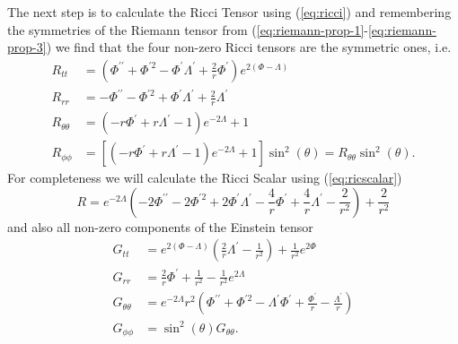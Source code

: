\documentclass[12pt]{article}
\numberwithin{equation}{section}
\numberwithin{figure}{section}
\begin{document}
The next step is to calculate the Ricci Tensor using (\ref{eq:ricci}) and remembering the symmetries of the Riemann tensor from (\ref{eq:riemann-prop-1}-\ref{eq:riemann-prop-3}) we find that the four non-zero Ricci tensors are the symmetric ones, i.e.
\begin{align}
R_{tt}&=\left(\Phi^{\prime\prime}+\Phi^{\prime2}-\Phi^\prime\Lambda^\prime+\frac{2}{r}\Phi^\prime\right)e^{2(\Phi-\Lambda)} \label{eq:riccibh1}	\\
R_{rr}&=-\Phi^{\prime\prime}-\Phi^{\prime2}+\Phi^\prime\Lambda^\prime+\frac{2}{r}\Lambda^\prime\label{eq:riccibh2}\\
R_{\theta\theta}&=(-r\Phi^\prime+r\Lambda^\prime -1)e^{-2\Lambda} +1	\label{eq:riccibh3}\\
R_{\phi\phi}&=[(-r\Phi^\prime+r\Lambda^\prime -1)e^{-2\Lambda} +1]\sin^2(\theta) = R_{\theta\theta} \sin^2(\theta).\label{eq:riccibh4}
\end{align}
For completeness we will calculate the Ricci Scalar using (\ref{eq:ricscalar})
\begin{equation}
	R=e^{-2\Lambda}\left(-2\Phi^{\prime\prime}-2\Phi^{\prime2}+2\Phi^\prime\Lambda^\prime- \frac{4}{r}\Phi^\prime +\frac{4}{r}\Lambda^\prime -\frac{2}{r^2}\right) +\frac{2}{r^2}
\end{equation}
and also all non-zero components of the Einstein tensor
\begin{align}
G_{tt} &= e^{2(\Phi-\Lambda)}\left(\frac{2}{r}\Lambda^\prime - \frac{1}{r^2}\right) +\frac{1}{r^2}e^{2\Phi}	\\
G_{rr} &= \frac{2}{r}\Phi^\prime + \frac{1}{r^2} - \frac{1}{r^2}e^{2\Lambda}	\\
G_{\theta\theta} &= e^{-2\Lambda}r^2\left(\Phi^{\prime\prime}+\Phi^{\prime2}-\Lambda^\prime\Phi^\prime +\frac{\Phi^\prime}{r}- \frac{\Lambda^\prime}{r}\right)\\
G_{\phi\phi} &= \sin^2(\theta)G_{\theta\theta}.
\end{align}
\end{document}
